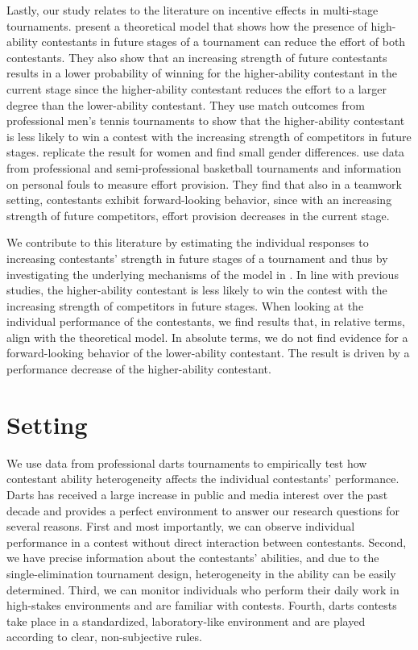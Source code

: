 \documentclass[11pt,a4paper]{article}
\let\Oldsection\section
\renewcommand{\section}{\FloatBarrier\Oldsection}
\begin{document}
Lastly, our study relates to the literature on incentive effects in multi-stage tournaments.  present a theoretical model that shows how the presence of high-ability contestants in future stages of a tournament can reduce the effort of both contestants. They also show that an increasing strength of future contestants results in a lower probability of winning for the higher-ability contestant in the current stage since the higher-ability contestant reduces the effort to a larger degree than the lower-ability contestant. They use match outcomes from professional men's tennis tournaments to show that the higher-ability contestant is less likely to win a contest with the increasing strength of competitors in future stages.  replicate the result for women and find small gender differences.  use data from professional and semi-professional basketball tournaments and information on personal fouls to measure effort provision. They find that also in a teamwork setting, contestants exhibit forward-looking behavior, since with an increasing strength of future competitors, effort provision decreases in the current stage.\par 

We contribute to this literature by estimating the individual responses to increasing contestants' strength in future stages of a tournament and thus by investigating the underlying mechanisms of the model in . In line with previous studies, the higher-ability contestant is less likely to win the contest with the increasing strength of competitors in future stages. When looking at the individual performance of the contestants, we find results that, in relative terms, align with the theoretical model. In absolute terms, we do not find evidence for a forward-looking behavior of the lower-ability contestant. The result is driven by a performance decrease of the higher-ability contestant.\par

\section{Setting}\label{sec:setting}

We use data from professional darts tournaments to empirically test how contestant ability heterogeneity affects the individual contestants' performance. Darts has received a large increase in public and media interest over the past decade and provides a perfect environment to answer our research questions for several reasons. First and most importantly, we can observe individual performance in a contest without direct interaction between contestants. Second, we have precise information about the contestants' abilities, and due to the single-elimination tournament design, heterogeneity in the ability can be easily determined. Third, we can monitor individuals who perform their daily work in high-stakes environments and are familiar with contests. Fourth, darts contests take place in a standardized, laboratory-like environment and are played according to clear, non-subjective rules. \par
\end{document}
